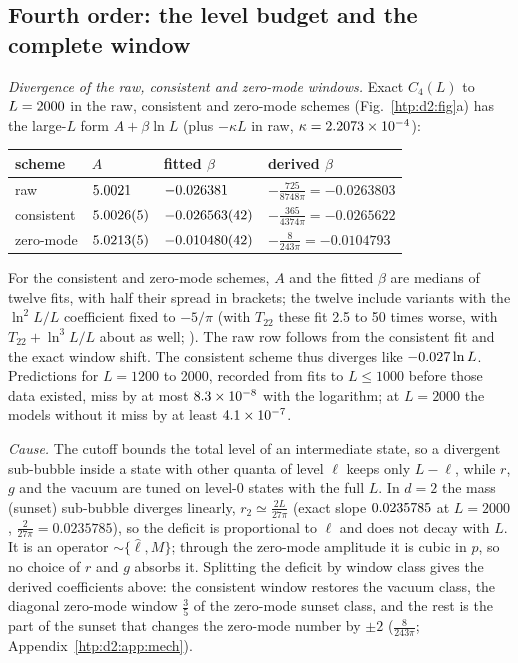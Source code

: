 \subsection{Fourth order: the level budget and the complete window}\label{htp:d2:c4}
\emph{Divergence of the raw, consistent and zero-mode windows.} Exact $C_4(L)$ to $L=2000$ in the raw, consistent and zero-mode schemes
(Fig.~\ref{htp:d2:fig}a) has the large-$L$ form $A+\beta\ln L$ (plus $-\kappa L$ in raw, $\kappa=2.2073\times10^{-4}$):
\begin{center}\small
\begin{tabular}{@{}llll@{}}
\toprule
scheme & $A$ & fitted $\beta$ & derived $\beta$ \\\midrule
raw & $5.0021$ & $-0.026381$ & $-\frac{725}{8748\pi}=-0.0263803$ \\
consistent & $5.0026(5)$ & $-0.026563(42)$ & $-\frac{365}{4374\pi}=-0.0265622$ \\
zero-mode & $5.0213(5)$ & $-0.010480(42)$ & $-\frac{8}{243\pi}=-0.0104793$ \\
\bottomrule
\end{tabular}
\end{center}
For the consistent and zero-mode schemes, $A$ and the fitted $\beta$ are medians of twelve fits, with half their spread in
brackets; the twelve include variants with the $\ln^2L/L$ coefficient fixed to $-5/\pi$ (with $T_{22}$ these fit 2.5 to 50 times
worse, with $T_{22}+\ln^3L/L$ about as well; ). The raw row follows from the consistent fit and the exact window shift.
The consistent scheme thus diverges like $-0.027\ln L$. Predictions for $L=1200$ to 2000, recorded from fits to
$L\le1000$ before those data existed, miss by at most $8.3\times10^{-8}$ with the logarithm; at $L=2000$ the models
without it miss by at least $4.1\times10^{-7}$.

\emph{Cause.} The cutoff bounds the total level of an intermediate state, so a divergent sub-bubble inside a state with other
quanta of level $\ell$ keeps only $L-\ell$, while $r$, $g$ and the vacuum are tuned on level-0 states with the full $L$. In
$d=2$ the mass (sunset) sub-bubble diverges linearly, $r_2\simeq\frac{2L}{27\pi}$ (exact slope $0.0235785$ at $L=2000$,
$\frac2{27\pi}=0.0235785$), so the deficit is proportional to $\ell$ and does not decay with $L$. It is an operator
${\sim}\{\hat\ell,M\}$; through the zero-mode amplitude it is cubic in $p$, so no choice of $r$ and $g$ absorbs it. Splitting the
deficit by window class gives the derived coefficients above: the consistent window restores the vacuum class, the diagonal
zero-mode window $\frac35$ of the zero-mode sunset class, and the rest is the part of the sunset that changes the
zero-mode number by $\pm2$ ($\frac8{243\pi}$; Appendix~\ref{htp:d2:app:mech}).

